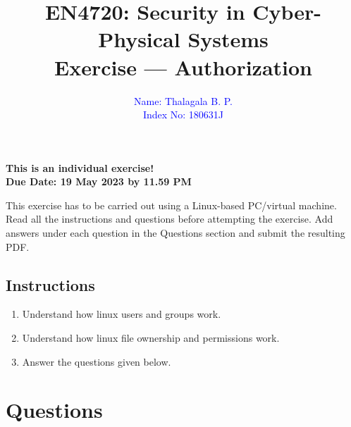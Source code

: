 \documentclass[11pt,letterpaper]{article}
\begin{document}
	
	\title{EN4720: Security in Cyber-Physical Systems \\ Exercise --- Authorization}
	
	\author{ \textcolor{blue}{Name: Thalagala B. P.} \\ \textcolor{blue}{Index No: 180631J}}
	
	\maketitle
	
	\begin{center}
		\color{red}\bf This is an individual exercise! \\ Due Date: 19 May 2023 by 11.59 PM
	\end{center}
	
	\vspace{1in}
	
	This exercise has to be carried out using a Linux-based PC/virtual machine. Read all the instructions and questions before attempting the exercise. Add answers under each question in the Questions section and submit the resulting PDF.
	
	\subsection*{Instructions}
	
	\begin{enumerate}
		\item Understand how linux users and groups work.
		
		\item Understand how linux file ownership and permissions work.
		
		\item Answer the questions given below.
		
	\end{enumerate}
	
	\newpage
	
	\section*{Questions}
	
%	
	
\end{document}
